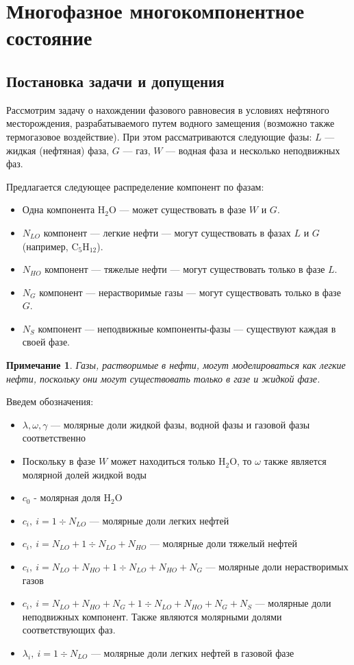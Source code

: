 \documentclass[12pt]{article}
\let\dividesymbol\div
\renewcommand{\div}{\operatorname{div}}
\newtheorem{note}{Примечание}[section]
\begin{document}
\section{Многофазное многокомпонентное состояние}

\subsection{Постановка задачи и допущения}

Рассмотрим задачу о нахождении фазового равновесия в условиях нефтяного месторождения, разрабатываемого путем водного замещения (возможно также термогазовое воздействие). При этом рассматриваются следующие фазы: $L$ --- жидкая (нефтяная) фаза, $G$ --- газ, $W$ --- водная фаза и несколько неподвижных фаз.

Предлагается следующее распределение компонент по фазам:
\begin{itemize}
\item Одна компонента $\mathrm{H_2O}$ --- может существовать в фазе $W$ и $G$.
\item $N_{LO}$ компонент --- легкие нефти --- могут существовать в фазах $L$ и $G$ (например, $\mathrm{C_5H_{12}}$).
\item $N_{HO}$ компонент --- тяжелые нефти --- могут существовать только в фазе $L$.
\item $N_{G}$ компонент --- нерастворимые газы --- могут существовать только в фазе $G$.
\item $N_{S}$ компонент --- неподвижные компоненты-фазы --- существуют каждая в своей фазе.
\end{itemize}

\begin{note}
Газы, растворимые в нефти, могут моделироваться как легкие нефти, поскольку они могут существовать только в газе и жидкой фазе.
\end{note}

Введем обозначения:
\begin{itemize}
\item $\lambda, \omega, \gamma$ --- молярные доли жидкой фазы, водной фазы и газовой фазы соответственно
\item Поскольку в фазе $W$ может находиться только $\mathrm{H_2O}$, то $\omega$ также является молярной долей жидкой воды
\item $c_0$ - молярная доля $\mathrm{H_2O}$
\item $c_i, \: i = 1 \dividesymbol N_{LO}$ --- молярные доли легких нефтей
\item $c_i, \: i = N_{LO} + 1 \dividesymbol N_{LO} + N_{HO}$ --- молярные доли тяжелый нефтей
\item $c_i, \: i = N_{LO} + N_{HO} + 1 \dividesymbol N_{LO} + N_{HO} + N_G$ --- молярные доли нерастворимых газов
\item $c_i, \: i = N_{LO} + N_{HO} + N_G + 1 \dividesymbol N_{LO} + N_{HO} + N_G + N_S$ --- молярные доли неподвижных компонент. Также являются молярными долями соответствующих фаз. 
\item $\lambda_i, \: i = 1 \dividesymbol N_{LO}$ --- молярные доли легких нефтей в газовой фазе

\end{itemize}
\end{document}
